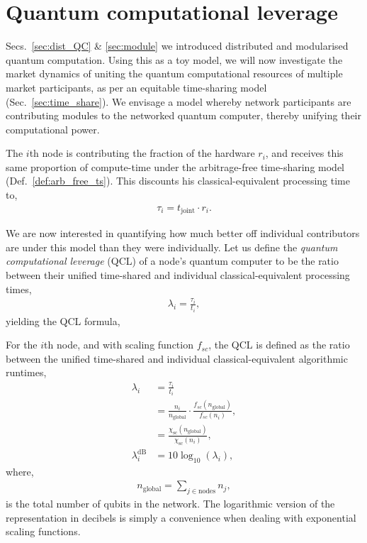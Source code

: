 %
%

\section{Quantum computational leverage}\label{sec:quant_ec_lev}

 Secs.~\ref{sec:dist_QC} \& \ref{sec:module} we introduced distributed and modularised quantum computation. Using this as a toy model, we will now investigate the market dynamics of uniting the quantum computational resources of multiple market participants, as per an equitable time-sharing model (Sec.~\ref{sec:time_share}). We envisage a model whereby network participants are contributing modules to the networked quantum computer, thereby unifying their computational power.

The $i$th node is contributing the fraction of the hardware $r_i$, and receives this same proportion of compute-time under the arbitrage-free time-sharing model (Def.~\ref{def:arb_free_ts}). This discounts his classical-equivalent processing time to,
\begin{align}
\tau_i = t_\mathrm{joint} \cdot r_i.
\end{align}

We are now interested in quantifying how much better off individual contributors are under this model than they were individually. Let us define the \textit{quantum computational leverage} (QCL) of a node's quantum computer to be the ratio between their unified time-shared and individual classical-equivalent processing times,
\begin{align}
\lambda_i = \frac{\tau_i}{t_i},
\end{align}
yielding the QCL formula,

\begin{definition} \label{def:quant_econ_lev}
For the $i$th node, and with scaling function $f_{sc}$, the QCL is defined as the ratio between the unified time-shared and individual classical-equivalent algorithmic runtimes,
\begin{align}
\lambda_i &= \frac{\tau_i}{t_i} \nonumber \\
&= \frac{n_i}{n_\mathrm{global}} \cdot \frac{f_{sc}(n_\mathrm{global})}{f_{sc}(n_i)}, \nonumber \\
&= \frac{\chi_\mathrm{sc}(n_\mathrm{global})}{\chi_\mathrm{sc}(n_i)},\nonumber\\
\lambda_i^\mathrm{dB} &= 10\log_{10}(\lambda_i),
\end{align}
where,
\begin{align}
	n_\mathrm{global} = \sum_{j\in \mathrm{nodes}} n_j,
\end{align}
is the total number of qubits in the network. The logarithmic version of the representation in decibels is simply a convenience when dealing with exponential scaling functions.
\end{definition}

